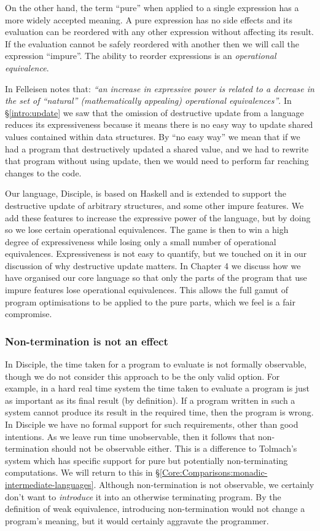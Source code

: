 On the other hand, the term ``pure'' when applied to a single expression has a more widely accepted meaning. A pure expression has no side effects and its evaluation can be reordered with any other expression without affecting its result. If the evaluation cannot be safely reordered with another then we will call the expression ``impure''. The ability to reorder expressions is an \emph{operational equivalence}. 

In \cite{felleisen:expressive-power} Felleisen notes that: \emph{``an increase in expressive power is related to a decrease in the set of ``natural'' (mathematically appealing) operational equivalences''}. In \S\ref{intro:update} we saw that the omission of destructive update from a language reduces its expressiveness because it means there is no easy way to update shared values contained within data structures. By ``no easy way'' we mean that if we had a program that destructively updated a shared value, and we had to rewrite that program without using update, then we would need to perform far reaching changes to the code. 

Our language, Disciple, is based on Haskell and is extended to support the destructive update of arbitrary structures, and some other impure features. We add these features to increase the expressive power of the language, but by doing so we lose certain operational equivalences. The game is then to win a high degree of expressiveness while losing only a small number of operational equivalences. Expressiveness is not easy to quantify, but we touched on it in our discussion of why destructive update matters. In Chapter 4 we discuss how we have organised our core language so that only the parts of the program that use impure features lose operational equivalences. This allows the full gamut of program optimisations to be applied to the pure parts, which we feel is a fair compromise.

\subsubsection{Non-termination is not an effect}
In Disciple, the time taken for a program to evaluate is not formally observable, though we do not consider this approach to be the only valid option. For example, in a hard real time system the time taken to evaluate a program is just as important as its final result (by definition). If a program written in such a system cannot produce its result in the required time, then the program is wrong. In Disciple we have no formal support for such requirements, other than good intentions. As we leave run time unobservable, then it follows that non-termination should not be observable either. This is a difference to Tolmach's system \cite{tolmach:optimizing-ml} which has specific support for pure but potentially non-terminating computations. We will return to this in \S\ref{Core:Comparisons:monadic-intermediate-languages}. Although non-termination is not observable, we certainly don't want to \emph{introduce} it into an otherwise terminating program. By the definition of weak equivalence, introducing non-termination would not change a program's meaning, but it would certainly aggravate the programmer. 

